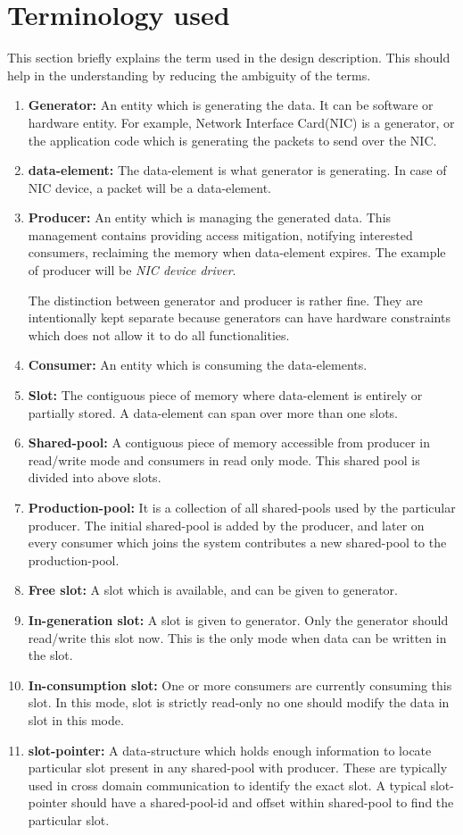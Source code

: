 \documentclass[a4paper,twoside]{report} %
\begin{document}
\section{Terminology used}
This section briefly explains the term used in the design 
description.  This should help in the understanding by reducing 
the ambiguity of the terms.
\begin{enumerate}
  \item \textbf{Generator:} An entity which is generating the data.  It
  can be software or hardware entity.  For example, Network
  Interface Card(NIC) is a generator, or the application code
  which is generating the packets to send over the NIC.
  \item \textbf{data-element:} The data-element is what generator 
  is generating. In case of NIC device, a packet will be a
  data-element.
  \item \textbf{Producer:} An entity which is managing the generated data.
  This management contains providing access mitigation, notifying
  interested consumers, reclaiming the memory when data-element
  expires.  The example of producer will be \textit{NIC device
  driver}.  


  The distinction between generator and producer is
  rather fine.  They are intentionally kept separate because
  generators can have hardware constraints which does not allow
  it to do all functionalities.
  \item \textbf{Consumer:} An entity which is consuming the data-elements. 
  \item \textbf{Slot:} The contiguous piece of memory where data-element is
  entirely or partially stored. A data-element can span over
  more than one slots. 
  \item \textbf{Shared-pool:} A contiguous piece of memory accessible 
   from producer in read/write mode and consumers in read only mode.
   This shared pool is divided into above slots.
  \item \textbf{Production-pool:} It is a collection of all
  shared-pools used by the particular producer.  The initial
  shared-pool is added by the producer, and later on every consumer
  which joins the system contributes a new shared-pool to the
  production-pool.
  \item \textbf{Free slot:} A slot which is available, and can be given
  to generator.
  \item \textbf{In-generation slot:} A slot is given to generator. Only 
  the generator should read/write this slot now.  This is the only
  mode when data can be written in the slot.
  \item \textbf{In-consumption slot:} One or more consumers are currently
  consuming this slot.  In this mode, slot is strictly read-only
  no one should modify the data in slot in this mode.
  \item \textbf{slot-pointer:} A data-structure which holds enough
  information to locate particular slot present in any shared-pool
  with producer.  These are typically used in cross domain
  communication to identify the exact slot.  A typical slot-pointer
  should have a shared-pool-id and offset within shared-pool to
  find the particular slot.
\end{enumerate}
\end{document}
